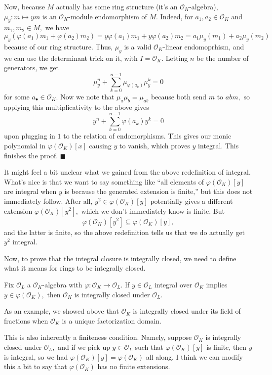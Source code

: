 Now, because $M$ actually has some ring structure (it's an $\mathcal O_K$-algebra), $\mu_y:m\mapsto ym$ is an $\mathcal O_K$-module endomorphism of $M.$ Indeed, for $a_1,a_2\in\mathcal O_K$ and $m_1,m_2\in M,$ we have
\[\mu_y(\varphi(a_1)m_1+\varphi(a_2)m_2)=y\varphi(a_1)m_1+y\varphi(a_2)m_2=a_1\mu_y(m_1)+a_2\mu_y(m_2)\]
because of our ring structure. Thus, $\mu_y$ is a valid $\mathcal O_K$-linear endomoprhism, and we can use the determinant trick on it, with $I=\mathcal O_K.$ Letting $n$ be the number of generators, we get
\[\mu_y^n+\sum_{k=0}^{n-1}\mu_{\varphi(a_k)}\mu_y^k=0\]
for some $a_\bullet\in\mathcal O_K.$ Now we note that $\mu_a\mu_b=\mu_{ab}$ because both send $m$ to $abm,$ so applying this multiplicativity to the above gives
\[y^n+\sum_{k=0}^{n-1}\varphi(a_k)y^k=0\]
upon plugging in $1$ to the relation of endomorphisms. This gives our monic polynomial in $\varphi(\mathcal O_K)[x]$ causing $y$ to vanish, which proves $y$ integral. This finishes the proof. $\blacksquare$

It might feel a bit unclear what we gained from the above redefinition of integral. What's nice is that we want to say something like ``all elements of $\varphi(\mathcal O_K)[y]$ are integral when $y$ is because the generated extension is finite,'' but this does not immediately follow. After all, $y^2\in\varphi(\mathcal O_K)[y]$ potentially gives a different extension $\varphi(\mathcal O_K)\left[y^2\right],$ which we don't immediately know is finite. But
\[\varphi(\mathcal O_K)\left[y^2\right]\subseteq\varphi(\mathcal O_K)[y],\]
and the latter is finite, so the above redefinition tells us that we do actually get $y^2$ integral.

Now, to prove that the integral closure is integrally closed, we need to define what it means for rings to be integrally closed.
\begin{definition}
    Fix $\mathcal O_L$ a $\mathcal O_K$-algebra with $\varphi:\mathcal O_K\to\mathcal O_L.$ If $y\in\mathcal O_L$ integral over $\mathcal O_K$ implies $y\in\varphi(\mathcal O_K),$ then $\mathcal O_K$ is integrally closed under $\mathcal O_L.$
\end{definition}
As an example, we showed above that $\mathcal O_K$ is integrally closed under its field of fractions when $\mathcal O_K$ is a unique factorization domain.

This is also inherently a finiteness condition. Namely, suppose $\mathcal O_K$ is integrally closed under $\mathcal O_L,$ and if we pick up $y\in\mathcal O_L$ such that $\varphi(\mathcal O_K)[y]$ is finite, then $y$ is integral, so we had $\varphi(\mathcal O_K)[y]=\varphi(\mathcal O_K)$ all along. I think we can modify this a bit to say that $\varphi(\mathcal O_K)$ has no finite extensions.

